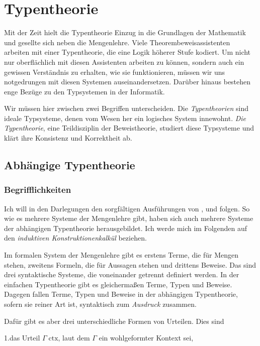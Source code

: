 
\chapter{Typentheorie}

Mit der Zeit hielt die Typentheorie Einzug in die Grundlagen der Mathematik
und gesellte sich neben die Mengenlehre. Viele Theorembeweisassistenten
arbeiten mit einer Typentheorie, die eine Logik höherer Stufe kodiert.
Um nicht nur oberflächlich mit diesen Assistenten arbeiten zu können, sondern
auch ein gewissen Verständnis zu erhalten, wie sie funktionieren, müssen wir
uns notgedrungen mit diesen Systemen auseinandersetzen. Darüber hinaus
bestehen enge Bezüge zu den Typsystemen in der Informatik.

Wir müssen hier zwischen zwei Begriffen unterscheiden. Die \emph{Typentheorien}
sind ideale Typsysteme, denen vom Wesen her ein logisches System innewohnt.
\emph{Die Typentheorie}, eine Teildisziplin der Beweistheorie, studiert
diese Typsysteme und klärt ihre Konsistenz und Korrektheit ab.

\section{Abhängige Typentheorie}

\subsection{Begrifflichkeiten}

Ich will in den Darlegungen den sorgfältigen Ausführungen von
\cite{Avigad}, \cite{Mimram} und \cite{HoTT} folgen. So wie es mehrere
Systeme der Mengenlehre gibt, haben sich auch mehrere Systeme der
abhängigen Typentheorie herausgebildet. Ich werde mich im Folgenden
auf den \emph{induktiven Konstruktionenkalkül} beziehen.

Im formalen System der Mengenlehre gibt es erstens Terme, die für Mengen
stehen, zweitens Formeln, die für Aussagen stehen und drittens Beweise.
Das sind drei syntaktische Systeme, die voneinander getrennt definiert
werden. In der einfachen Typentheorie gibt es gleichermaßen Terme, Typen und
Beweise. Dagegen fallen Terme, Typen und Beweise in der abhängigen
Typentheorie, sofern sie reiner Art ist, syntaktisch zum \emph{Ausdruck}
zusammen.

Dafür gibt es aber drei unterschiedliche Formen von Urteilen. Dies sind

1.\;das Urteil $\Gamma\;\mathrm{ctx}$, laut dem $\Gamma$ ein
wohlgeformter Kontext sei,

